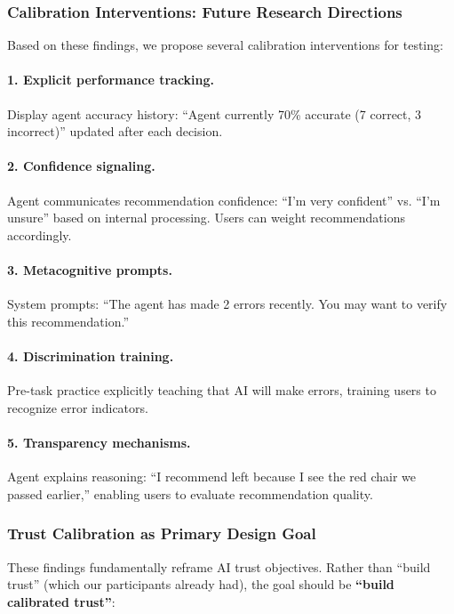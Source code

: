 \documentclass[12pt]{article}
\begin{document}
\subsubsection{Calibration Interventions: Future Research Directions}

Based on these findings, we propose several calibration interventions for testing:

\paragraph{1. Explicit performance tracking.} Display agent accuracy history: ``Agent currently 70\% accurate (7 correct, 3 incorrect)'' updated after each decision.

\paragraph{2. Confidence signaling.} Agent communicates recommendation confidence: ``I'm very confident'' vs. ``I'm unsure'' based on internal processing. Users can weight recommendations accordingly.

\paragraph{3. Metacognitive prompts.} System prompts: ``The agent has made 2 errors recently. You may want to verify this recommendation.''

\paragraph{4. Discrimination training.} Pre-task practice explicitly teaching that AI will make errors, training users to recognize error indicators.

\paragraph{5. Transparency mechanisms.} Agent explains reasoning: ``I recommend left because I see the red chair we passed earlier,'' enabling users to evaluate recommendation quality.

\subsubsection{Trust Calibration as Primary Design Goal}

These findings fundamentally reframe AI trust objectives. Rather than ``build trust'' (which our participants already had), the goal should be \textbf{``build calibrated trust''}:
\end{document}
